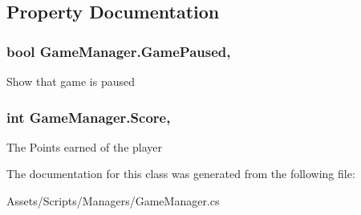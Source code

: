 \subsection{Property Documentation}
\subsubsection[{\texorpdfstring{Game\+Paused}{GamePaused}}]{\setlength{\rightskip}{0pt plus 5cm}bool Game\+Manager.\+Game\+Paused\hspace{0.3cm}{\ttfamily [static]}, {\ttfamily [get]}}\hypertarget{class_game_manager_a9a7aa34c324c433dd80fa0d7d1bf37e8}{}\label{class_game_manager_a9a7aa34c324c433dd80fa0d7d1bf37e8}


Show that game is paused 

\subsubsection[{\texorpdfstring{Score}{Score}}]{\setlength{\rightskip}{0pt plus 5cm}int Game\+Manager.\+Score\hspace{0.3cm}{\ttfamily [static]}, {\ttfamily [get]}}\hypertarget{class_game_manager_a77a552c74394d1e18c0bb2893bd27cb0}{}\label{class_game_manager_a77a552c74394d1e18c0bb2893bd27cb0}


The Points earned of the player 



The documentation for this class was generated from the following file\+:\begin{DoxyCompactItemize}
\item 
Assets/\+Scripts/\+Managers/Game\+Manager.\+cs\end{DoxyCompactItemize}
